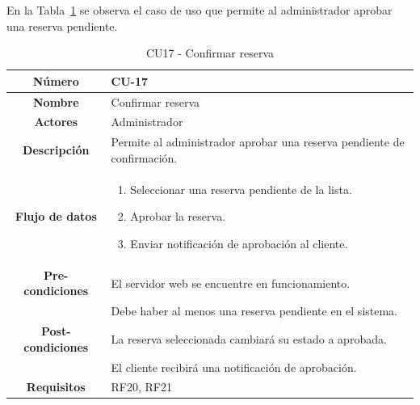 En la Tabla~\ref{tbl:CU17} se observa el caso de uso que permite al administrador aprobar una reserva pendiente.
\begin{table}[h!tb]
	\centering
	\begin{adjustbox}{width=1\textwidth}
	\begin{tabular}{|c|p{\textwidth}|}
		\hline {\bf Número} & CU-17 \\
		\hline {\bf Nombre} & Confirmar reserva\\
		\hline {\bf Actores} & Administrador \\
		\hline {\bf Descripción} & Permite al administrador aprobar una reserva pendiente de confirmación. \\
		\hline {\bf Flujo de datos}
		& 
		\begin{enumerate}
			\item Seleccionar una reserva pendiente de la lista.
			\item Aprobar la reserva.
			\item Enviar notificación de aprobación al cliente.
		\end{enumerate}\\
		\hline {\bf Pre-condiciones}
		& El servidor web se encuentre en funcionamiento. \\
		& Debe haber al menos una reserva pendiente en el sistema. \\
		\hline {\bf Post-condiciones}
		& La reserva seleccionada cambiará su estado a aprobada. \\
		& El cliente recibirá una notificación de aprobación. \\
		\hline {\bf Requisitos} & RF20, RF21 \\
		\hline 
	\end{tabular}
	\end{adjustbox}
	\caption{CU17 - Confirmar reserva\label{tbl:CU17}}
\end{table}

